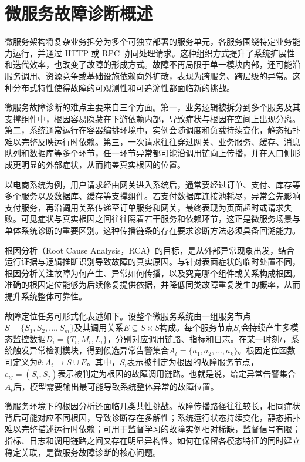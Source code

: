 
\section{微服务故障诊断概述}

微服务架构将复杂业务拆分为多个可独立部署的服务单元，各服务围绕特定业务能力运行，并通过 HTTP 或 RPC 协同处理请求。这种组织方式提升了系统扩展性和迭代效率，也改变了故障的形成方式。故障不再局限于单一模块内部，还可能沿服务调用、资源竞争或基础设施依赖向外扩散，表现为跨服务、跨层级的异常。这种分布式特性使得故障的可观测性和可追溯性都面临新的挑战。

微服务故障诊断的难点主要来自三个方面。第一，业务逻辑被拆分到多个服务及其支撑组件中，根因容易隐藏在下游依赖内部，导致症状与根因在空间上出现分离。第二，系统通常运行在容器编排环境中，实例会随调度和负载持续变化，静态拓扑难以完整反映运行时依赖。第三，一次请求往往穿过网关、业务服务、缓存、消息队列和数据库等多个环节，任一环节异常都可能沿调用链向上传播，并在入口侧形成更明显的外部症状，从而掩盖真实根因的位置。

以电商系统为例，用户请求经由网关进入系统后，通常要经过订单、支付、库存等多个服务以及数据库、缓存等支撑组件。若支付数据库连接池耗尽，异常会先影响支付服务，再沿调用关系传递至订单服务和网关，最终表现为页面超时或请求失败。可见症状与真实根因之间往往隔着若干服务和依赖环节，这正是微服务场景与单体系统诊断的重要区别。这种传播链条的存在要求诊断方法必须具备回溯能力。

根因分析（Root Cause Analysis，RCA）的目标，是从外部异常现象出发，结合运行证据与逻辑推断识别导致故障的真实原因。与针对表面症状的临时处置不同，根因分析关注故障为何产生、异常如何传播，以及究竟哪个组件或关系构成根因。准确的根因定位能够为后续修复提供依据，并降低同类故障重复发生的概率，从而提升系统整体可靠性。

故障定位任务可形式化表述如下。设整个微服务系统由一组服务节点$S=\{S_1, S_2, \ldots, S_m\}$及其调用关系$E \subseteq S \times S$构成。每个服务节点$S_i$会持续产生多模态监控数据$D_i = \{T_i, M_i, L_i\}$，分别对应调用链路、指标和日志。在某一时刻$t$，系统触发异常检测模块，得到候选异常告警集合$A_t = \{a_1, a_2, \ldots, a_k\}$。根因定位函数可定义为$\theta: A_t \rightarrow S \cup E$。其中，$S_i$表示被判定为根因的故障服务节点，$e_{ij} = (S_i, S_j)$表示被判定为根因的故障调用链路。也就是说，给定异常告警集合$A_t$后，模型需要输出最可能导致系统整体异常的故障位置。

微服务环境下的根因分析还面临几类共性挑战。故障传播路径往往较长，相同症状背后可能对应不同根因，导致诊断存在多解性；系统运行状态持续变化，静态拓扑难以完整描述运行时依赖；可用于监督学习的故障实例相对稀缺，监督信号有限；指标、日志和调用链路之间又存在明显异构性。如何在保留各模态特征的同时建立稳定关联，是微服务故障诊断的核心问题。
